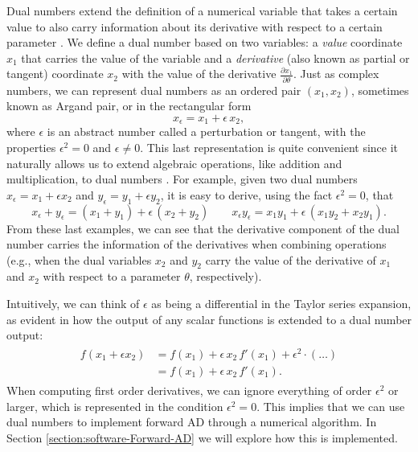 Dual numbers extend the definition of a numerical variable that takes a certain value to also carry information about its derivative with respect to a certain parameter \cite{clifford1871dualnumbers}. 
We define a dual number based on two variables: a \textit{value} coordinate $x_1$ that carries the value of the variable and a \textit{derivative} (also known as partial or tangent) coordinate $x_2$ with the value of the derivative $\frac{\partial x_1}{\partial \theta}$. 
Just as complex numbers, we can represent dual numbers as an ordered pair $(x_1, x_2)$, sometimes known as Argand pair, or in the rectangular form 
\begin{equation}
 x_\epsilon = x_1 + \epsilon \, x_2,
\end{equation}
where $\epsilon$ is an abstract number called a perturbation or tangent, with the properties $\epsilon^2 = 0$ and $\epsilon \neq 0$.
This last representation is quite convenient since it naturally allows us to extend algebraic operations, like addition and multiplication, to dual numbers \cite{Karczmarczuk2001}. 
For example, given two dual numbers $x_\epsilon = x_1 + \epsilon x_2$ and $y_\epsilon = y_1 + \epsilon y_2$, it is easy to derive, using the fact $\epsilon^2=0$, that
\begin{equation}
 x_\epsilon + y_\epsilon = (x_1 + y_1) + \epsilon \, (x_2 + y_2)
 \qquad
 x_\epsilon y_\epsilon = x_1 y_1 + \epsilon \, (x_1 y_2 + x_2 y_1) .
\end{equation}
From these last examples, we can see that the derivative component of the dual number carries the information of the derivatives when combining operations (e.g., when the dual variables $x_2$ and $y_2$ carry the value of the derivative of $x_1$ and $x_2$ with respect to a parameter $\theta$, respectively). 

Intuitively, we can think of $\epsilon$ as being a differential in the Taylor series expansion, as evident in how the output of any scalar functions is extended to a dual number output:
\begin{align}
\begin{split}
    f(x_1 + \epsilon x_2)
    &= 
    f(x_1)
    + 
    \epsilon \, x_2 \,  f'(x_1)
    + 
    \epsilon^2 \cdot ( \ldots )\\
    &= 
    f(x_1)
    + 
    \epsilon \, x_2 \,  f'(x_1).
\end{split}
\label{eq:dual-number-function}
\end{align}
When computing first order derivatives, we can ignore everything of order $\epsilon^2$ or larger, which is represented in the condition $\epsilon^2 = 0$.
This implies that we can use dual numbers to implement forward AD through a numerical algorithm. 
In Section \ref{section:software-Forward-AD} we will explore how this is implemented. 

